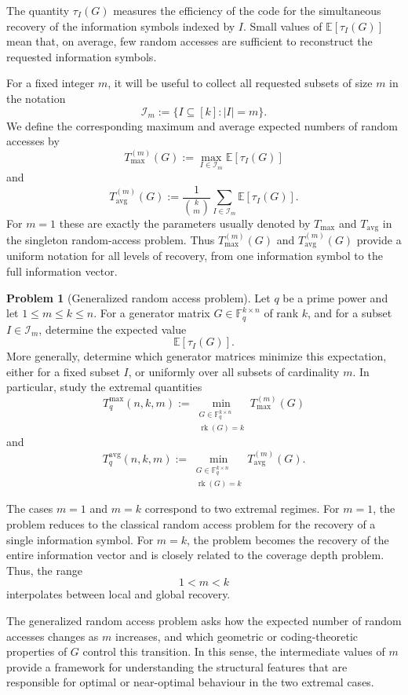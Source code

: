 \documentclass[11pt,a4paper]{article}
\numberwithin{equation}{section}
\theoremstyle{definition}
\theoremstyle{definition}
\newtheorem{problem}[definition]{Problem}
\newcommand{\F}{\mathbb{F}}
\newcommand{\E}{\mathbb{E}}
\newcommand{\cI}{\mathcal{I}}
\newcommand{\Tmax}{T_{\max}}
\newcommand{\Tavg}{T_{\mathrm{avg}}}
\newcommand{\rk}{\operatorname{rk}}
\begin{document}
The quantity $\tau_I(G)$ measures the efficiency of the code for the simultaneous recovery of the information symbols indexed by $I$.  Small values of $\E[\tau_I(G)]$ mean that, on average, few random accesses are sufficient to reconstruct the requested information symbols.

For a fixed integer $m$, it will be useful to collect all requested subsets of size $m$ in the notation
\[
\cI_m:=\{I\subseteq [k]: |I|=m\}.
\]
We define the corresponding maximum and average expected numbers of random accesses by
\[
\Tmax^{(m)}(G):=
\max_{I\in \cI_m}\E[\tau_I(G)]
\]
and
\[
\Tavg^{(m)}(G):=
\frac{1}{\binom{k}{m}}
\sum_{I\in \cI_m}\E[\tau_I(G)].
\]
For $m=1$ these are exactly the parameters usually denoted by $\Tmax$ and $\Tavg$ in the singleton random-access problem.  Thus $\Tmax^{(m)}(G)$ and $\Tavg^{(m)}(G)$ provide a uniform notation for all levels of recovery, from one information symbol to the full information vector.

\begin{problem}[Generalized random access problem]\label{prob:generalized-random-access}
Let $q$ be a prime power and let $1\leq m\leq k\leq n$.  For a generator matrix
$G\in \F_q^{k\times n}$ of rank $k$, and for a subset $I\in \cI_m$, determine the expected value
\[
\E[\tau_I(G)].
\]
More generally, determine which generator matrices minimize this expectation, either for a fixed subset $I$, or uniformly over all subsets of cardinality $m$.  In particular, study the extremal quantities
\[
T_q^{\max}(n,k,m):=
\min_{\substack{G\in \F_q^{k\times n}\\ \rk(G)=k}}
\Tmax^{(m)}(G)
\]
and
\[
T_q^{\mathrm{avg}}(n,k,m):=
\min_{\substack{G\in \F_q^{k\times n}\\ \rk(G)=k}}
\Tavg^{(m)}(G).
\]
\end{problem}

The cases $m=1$ and $m=k$ correspond to two extremal regimes.  For $m=1$, the problem reduces to the classical random access problem for the recovery of a single information symbol.  For $m=k$, the problem becomes the recovery of the entire information vector and is closely related to the coverage depth problem.  Thus, the range
\[
1<m<k
\]
interpolates between local and global recovery.

The generalized random access problem asks how the expected number of random accesses changes as $m$ increases, and which geometric or coding-theoretic properties of $G$ control this transition.  In this sense, the intermediate values of $m$ provide a framework for understanding the structural features that are responsible for optimal or near-optimal behaviour in the two extremal cases.
\end{document}
